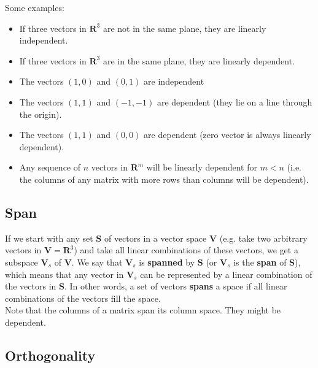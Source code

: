 \documentclass[11pt]{article}
\theoremstyle{plain}
\theoremstyle{definition}
\theoremstyle{remark}
\numberwithin{equation}{section}
\begin{document}
Some examples:
\begin{itemize}[noitemsep] %
\item If three vectors in $\mathbf{R}^3$ are not in the same plane, they are linearly independent.
\item If three vectors in $\mathbf{R}^3$ are in the same plane, they are linearly dependent.
\item The vectors $(1, 0)$ and $(0, 1)$ are independent
\item The vectors $(1, 1)$ and $(-1, -1)$ are dependent (they lie on a line through the origin).
\item The vectors $(1, 1)$ and $(0, 0)$ are dependent (zero vector is always linearly dependent).
\item Any sequence of $n$ vectors in $\mathbf{R}^m$ will be linearly dependent for $m < n$ (i.e. the columns of any matrix with more rows than columns will be dependent).
\end{itemize}



\subsection{Span}

If we start with any set $\mathbf{S}$ of vectors in a vector space $\mathbf{V}$ (e.g. take two arbitrary vectors in $\mathbf{V} = \mathbf{R}^3$) and take all linear combinations of these vectors, we get a subspace $\mathbf{V}_s$ of $\mathbf{V}$. We say that $\mathbf{V}_s$ is {\bf spanned} by $\mathbf{S}$ (or $\mathbf{V}_s$ is the {\bf span} of $\mathbf{S}$), which means that any vector in $\mathbf{V}_s$ can be represented by a linear combination of the vectors in $\mathbf{S}$. In other words, a set of vectors {\bf spans} a space if all linear combinations of the vectors fill the space.
\\

Note that the columns of a matrix span its column space. They might be dependent.


\subsection{Orthogonality}

\end{document}
